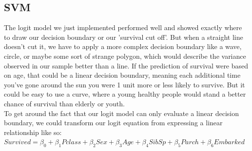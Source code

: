 \documentclass{article}
\begin{document}
\subsection{SVM}

The logit model we just implemented performed well and showed exactly where to draw our decision boundary or our 'survival cut off'. But when a straight line doesn't cut it, we have to apply a more complex decision boundary like a wave, circle, or maybe some sort of strange polygon, which would describe the variance observed in our sample better than a line. If the prediction of survival were based on age, that could be a linear decision boundary, meaning each additional time you've gone around the sun you were 1 unit more or less likely to survive. But it could be easy to use a curve, where a young healthy people would stand a better  chance of survival than elderly or youth. \\

To get around the fact that our logit model can only evaluate a linear decision boundary, we could transform our logit equation from expressing a linear relationship like so:\\

{\centering
$Survived=\beta_0+\beta_1Pclass+\beta_2Sex+\beta_3Age+\beta_4SibSp+\beta_5Parch+\beta_6Embarked$}\\
\end{document}

